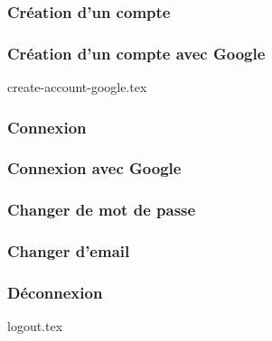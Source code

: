 \subsubsection{Création d'un compte}
\subsubsection{Création d'un compte avec Google}
{create-account-google.tex}
\subsubsection{Connexion}
\subsubsection{Connexion avec Google}
\subsubsection{Changer de mot de passe}
\subsubsection{Changer d'email}

\subsubsection{Déconnexion}
{logout.tex}